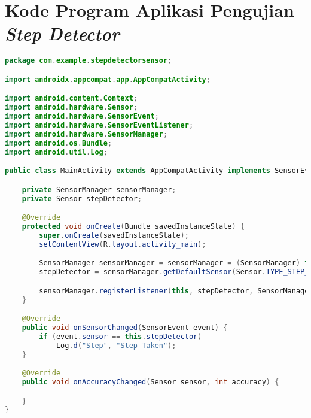 \chapter{Kode Program Aplikasi Pengujian \textit{Step Detector}}
\label{lamp:A}

\begin{lstlisting}[language=Java,caption=StepDetectorSensor.java]
package com.example.stepdetectorsensor;

import androidx.appcompat.app.AppCompatActivity;

import android.content.Context;
import android.hardware.Sensor;
import android.hardware.SensorEvent;
import android.hardware.SensorEventListener;
import android.hardware.SensorManager;
import android.os.Bundle;
import android.util.Log;

public class MainActivity extends AppCompatActivity implements SensorEventListener {

    private SensorManager sensorManager;
    private Sensor stepDetector;

    @Override
    protected void onCreate(Bundle savedInstanceState) {
        super.onCreate(savedInstanceState);
        setContentView(R.layout.activity_main);

        SensorManager sensorManager = sensorManager = (SensorManager) this.getSystemService(Context.SENSOR_SERVICE);
        stepDetector = sensorManager.getDefaultSensor(Sensor.TYPE_STEP_DETECTOR);

        sensorManager.registerListener(this, stepDetector, SensorManager.SENSOR_DELAY_FASTEST);
    }

    @Override
    public void onSensorChanged(SensorEvent event) {
        if (event.sensor == this.stepDetector)
            Log.d("Step", "Step Taken");
    }

    @Override
    public void onAccuracyChanged(Sensor sensor, int accuracy) {

    }
}
\end{lstlisting}




  
